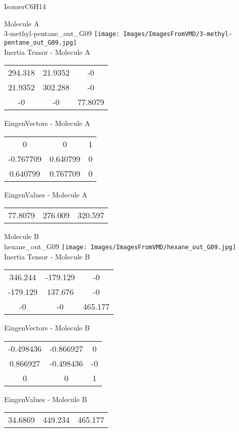 \vtab[-2cm]
\begin{center}
{\large IsomerC6H14}
\end{center}
\begin{multicols}{2}
\begin{center}
Molecule A \\ 
3-methyl-pentane\_out\_G09
\texttt{[image: Images/ImagesFromVMD/3-methyl-pentane\_out\_G09.jpg]}
\\
Inertia Tensor - Molecule A \\
\vtab
\begin{tabular}{|c c c|}
294.318	 & 	21.9352	 & 	-0	 \\
21.9352	 & 	302.288	 & 	-0	 \\
-0	 & 	-0	 & 	77.8079
\end{tabular}

\vtab
 EingenVectors - Molecule A     \\
\vtab
\begin{tabular}{|c c c|}
0	 & 	0	 & 	1	 \\
-0.767709	 & 	0.640799	 & 	0	 \\
0.640799	 & 	0.767709	 & 	0
\end{tabular}

\vtab
 EingenValues - Molecule A     \\
\vtab
\begin{tabular}{|c c c|}
77.8079	 & 	276.009	 & 	320.597
\end{tabular}
\columnbreak

Molecule B \\ 
hexane\_out\_G09
\texttt{[image: Images/ImagesFromVMD/hexane\_out\_G09.jpg]}
\\
Inertia Tensor - Molecule B \\
\vtab
\begin{tabular}{|c c c|}
346.244	 & 	-179.129	 & 	-0	 \\
-179.129	 & 	137.676	 & 	-0	 \\
-0	 & 	-0	 & 	465.177
\end{tabular}

\vtab
 EingenVectors - Molecule B     \\
\vtab
\begin{tabular}{|c c c|}
-0.498436	 & 	-0.866927	 & 	0	 \\
0.866927	 & 	-0.498436	 & 	-0	 \\
0	 & 	0	 & 	1
\end{tabular}

\vtab
 EingenValues - Molecule B     \\
\vtab
\begin{tabular}{|c c c|}
34.6869	 & 	449.234	 & 	465.177
\end{tabular}

\end{center}
\end{multicols}
